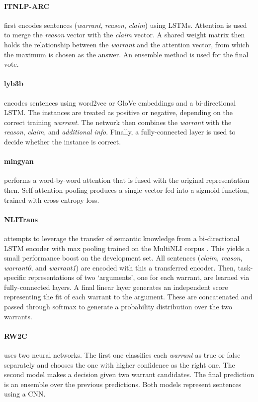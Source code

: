 \paragraph{ITNLP-ARC}
first encodes sentences (\emph{warrant}, \emph{reason}, \emph{claim}) using LSTMs. Attention is used to merge the \emph{reason} vector with the \emph{claim} vector. A shared weight matrix then holds the relationship between the \emph{warrant} and the attention vector, from which the maximum is chosen as the answer. An ensemble method is used for the final vote.


\paragraph{lyb3b}
encodes sentences using word2vec or GloVe embeddings and a bi-directional LSTM. The instances are treated as positive or negative, depending on the correct training \emph{warrant}. The network then combines the \emph{warrant} with the \emph{reason}, \emph{claim}, and \emph{additional info}. Finally, a fully-connected layer is used to decide whether the instance is correct.


\paragraph{mingyan}
performs a word-by-word attention that is fused with the original representation then. Self-attention pooling produces a single vector fed into a sigmoid function, trained with cross-entropy loss.


\paragraph{NLITrans}
attempts to leverage the transfer of semantic knowledge from a bi-directional LSTM encoder with max pooling trained on the MultiNLI corpus \cite{nangia-EtAl:2017:RepEval}. This yields a small performance boost on the development set. All sentences (\emph{claim}, \emph{reason}, \emph{warrant0}, and \emph{warrant1}) are encoded with this a transferred encoder. Then, task-specific representations of two `arguments', one for each warrant, are learned via fully-connected layers. A final linear layer generates an independent score representing the fit of each warrant to the argument. These are concatenated and passed through softmax to generate a probability distribution over the two warrants.


\paragraph{RW2C}
uses two neural networks. The first one classifies each \emph{warrant} as true or false separately and chooses the one with higher confidence as the right one. The second model makes a decision given two warrant candidates. The final prediction is an ensemble over the previous predictions. Both models represent sentences using a CNN.


